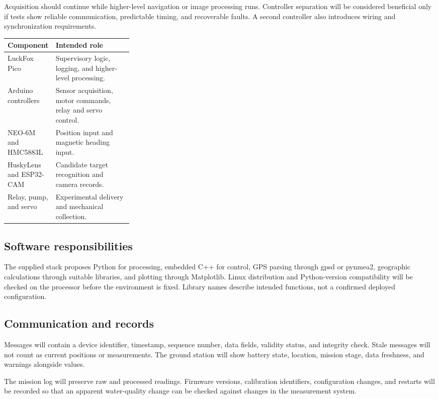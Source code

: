 \documentclass[12pt,a4paper]{article}
\begin{document}
Acquisition should continue while higher-level navigation or image processing runs. Controller separation will be considered beneficial only if tests show reliable communication, predictable timing, and recoverable faults. A second controller also introduces wiring and synchronization requirements.

\begin{center}\small
\begin{tabularx}{\linewidth}{@{}p{0.29\linewidth}Y@{}}
\toprule Component & Intended role\\\midrule
LuckFox Pico & Supervisory logic, logging, and higher-level processing.\\
Arduino controllers & Sensor acquisition, motor commands, relay and servo control.\\
NEO-6M and HMC5883L & Position input and magnetic heading input.\\
HuskyLens and ESP32-CAM & Candidate target recognition and camera records.\\
Relay, pump, and servo & Experimental delivery and mechanical collection.\\
\bottomrule
\end{tabularx}\end{center}

\subsection{Software responsibilities}
The supplied stack proposes Python for processing, embedded C++ for control, GPS parsing through gpsd or pynmea2, geographic calculations through suitable libraries, and plotting through Matplotlib. Linux distribution and Python-version compatibility will be checked on the processor before the environment is fixed. Library names describe intended functions, not a confirmed deployed configuration.

\subsection{Communication and records}
Messages will contain a device identifier, timestamp, sequence number, data fields, validity status, and integrity check. Stale messages will not count as current positions or measurements. The ground station will show battery state, location, mission stage, data freshness, and warnings alongside values.

The mission log will preserve raw and processed readings. Firmware versions, calibration identifiers, configuration changes, and restarts will be recorded so that an apparent water-quality change can be checked against changes in the measurement system.
\end{document}
